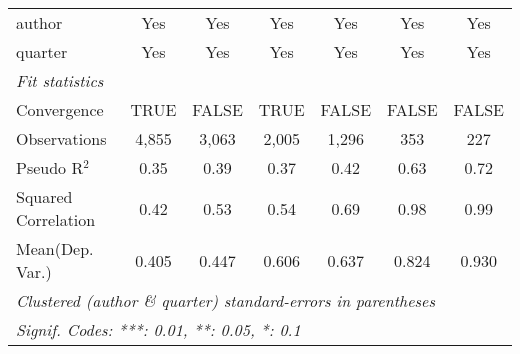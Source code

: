 \begin{tabular}{lcccccc}
   author                                                     & Yes           & Yes          & Yes           & Yes           & Yes           & Yes\\  
   quarter                                                    & Yes           & Yes          & Yes           & Yes           & Yes           & Yes\\  
   \midrule
   \emph{Fit statistics}\\
   Convergence                                                &TRUE           & FALSE        & TRUE          & FALSE         & FALSE         & FALSE\\  
   Observations                                               & 4,855         & 3,063        & 2,005         & 1,296         & 353           & 227\\  
   Pseudo R$^2$                                               & 0.35          & 0.39         & 0.37          & 0.42          & 0.63          & 0.72\\  
   Squared Correlation                                        & 0.42          & 0.53         & 0.54          & 0.69          & 0.98          & 0.99\\  
Mean(Dep. Var.) & 0.405 & 0.447 & 0.606 & 0.637 & 0.824 & 0.930 \\
   \midrule \midrule
   \multicolumn{7}{l}{\emph{Clustered (author \& quarter) standard-errors in parentheses}}\\
   \multicolumn{7}{l}{\emph{Signif. Codes: ***: 0.01, **: 0.05, *: 0.1}}\\
\end{tabular}
\par\endgroup
